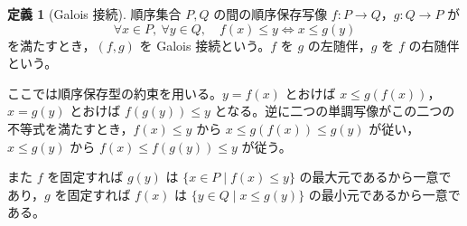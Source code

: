 \documentclass[a5paper,10pt,dvipdfmx]{jsarticle}
\theoremstyle{definition}
\newtheorem{defn}[ruledef]{定義}
\theoremstyle{plain}
\newcommand{\iffc}{\Longleftrightarrow}
\begin{document}
\begin{defn}[Galois 接続]\label{k93}
順序集合 $P,Q$ の間の順序保存写像 $f:P\to Q$，$g:Q\to P$ が
\[
 \forall x\in P,\ \forall y\in Q,\quad
 f(x)\leq y\iffc x\leq g(y)
\]
を満たすとき，$(f,g)$ を Galois 接続という。$f$ を $g$ の左随伴，$g$ を $f$ の右随伴という。
\end{defn}
ここでは順序保存型の約束を用いる。$y=f(x)$ とおけば $x\leq g(f(x))$，$x=g(y)$ とおけば $f(g(y))\leq y$ となる。逆に二つの単調写像がこの二つの不等式を満たすとき，$f(x)\leq y$ から $x\leq g(f(x))\leq g(y)$ が従い，$x\leq g(y)$ から $f(x)\leq f(g(y))\leq y$ が従う。

また $f$ を固定すれば $g(y)$ は $\{x\in P\mid f(x)\leq y\}$ の最大元であるから一意であり，$g$ を固定すれば $f(x)$ は $\{y\in Q\mid x\leq g(y)\}$ の最小元であるから一意である。
\end{document}
